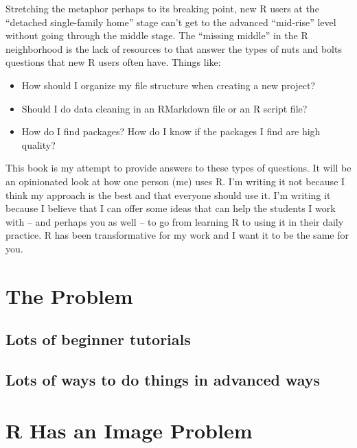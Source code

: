 \documentclass[]{book}
\providecommand{\tightlist}{%
  \setlength{\itemsep}{0pt}\setlength{\parskip}{0pt}}
\begin{document}
Stretching the metaphor perhaps to its breaking point, new R users at the ``detached single-family home'' stage can't get to the advanced ``mid-rise'' level without going through the middle stage. The ``missing middle'' in the R neighborhood is the lack of resources to that answer the types of nuts and bolts questions that new R users often have. Things like:

\begin{itemize}
\tightlist
\item
  How should I organize my file structure when creating a new project?
\item
  Should I do data cleaning in an RMarkdown file or an R script file?
\item
  How do I find packages? How do I know if the packages I find are high quality?
\end{itemize}

This book is my attempt to provide answers to these types of questions. It will be an opinionated look at how one person (me) uses R. I'm writing it not because I think my approach is the best and that everyone should use it. I'm writing it because I believe that I can offer some ideas that can help the students I work with -- and perhaps you as well -- to go from learning R to using it in their daily practice. R has been transformative for my work and I want it to be the same for you.

\hypertarget{the-problem}{%
\section{The Problem}\label{the-problem}}

\hypertarget{lots-of-beginner-tutorials}{%
\subsection{Lots of beginner tutorials}\label{lots-of-beginner-tutorials}}

\hypertarget{lots-of-ways-to-do-things-in-advanced-ways}{%
\subsection{Lots of ways to do things in advanced ways}\label{lots-of-ways-to-do-things-in-advanced-ways}}

\hypertarget{r-has-an-image-problem}{%
\section{R Has an Image Problem}\label{r-has-an-image-problem}}
\end{document}

